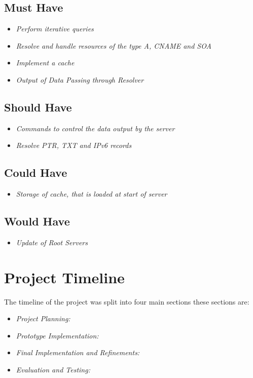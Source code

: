 \documentclass{l3proj}
\begin{document}
\subsection{Must Have}
	\begin{itemize}[noitemsep]
	\item{ \textit{Perform iterative queries} }
	\item{ \textit{Resolve and handle resources of the type A, CNAME and SOA} }
    \item{ \textit{Implement a cache} }
    \item{ \textit{Output of Data Passing through Resolver} }
	\end{itemize}

\subsection{Should Have}
	\begin{itemize}[noitemsep]
    \item{ \textit{Commands to control the data output by the server} }
	\item{ \textit{Resolve PTR, TXT and IPv6 records} }
	\end{itemize}

\subsection{Could Have}
	\begin{itemize}[noitemsep]
	\item{ \textit{Storage of cache, that is loaded at start of server} }
	\end{itemize}

\subsection{Would Have}
	\begin{itemize}[noitemsep]
	\item{ \textit{Update of Root Servers} }
	\end{itemize}

\section{Project Timeline}

The timeline of the project was split into four main sections these sections are:
\begin{itemize}[noitemsep]
	\item{ \textit{Project Planning:} }
	\item{ \textit{Prototype Implementation:} }
	\item{ \textit{Final Implementation and Refinements:} }
	\item{ \textit{Evaluation and Testing:} }
\end{itemize}
\end{document}
